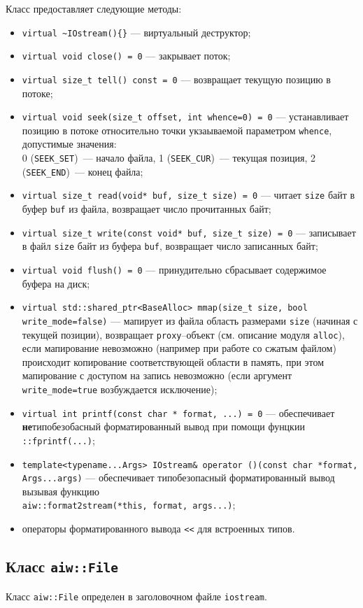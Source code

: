 Класс предоставляет следующие методы:
\begin{itemize}
\item \verb'virtual ~IOstream(){}' --- виртуальный деструктор;
\item \verb'virtual void close() = 0' --- закрывает поток;
\item \verb'virtual size_t tell() const = 0' --- возвращает текущую позицию в потоке;
\item \verb'virtual void seek(size_t offset, int whence=0) = 0' --- устанавливает позицию в потоке относительно
  точки укзаываемой параметром \verb'whence', допустимые значения:\\
  0 (\verb'SEEK_SET')~--- начало файла, 1 (\verb'SEEK_CUR')~--- текущая позиция, 2 (\verb'SEEK_END')~--- конец файла;
\item \verb'virtual size_t read(void* buf, size_t size) = 0' --- читает \verb'size' байт в буфер \verb'buf' из файла,
  возвращает число прочитанных байт;
\item \verb'virtual size_t write(const void* buf, size_t size) = 0' --- записывает в файл \verb'size' байт из буфера \verb'buf',
  возвращает число записанных байт;
\item \verb'virtual void flush() = 0' --- принудительно сбрасывает содержимое буфера на диск;
\item \verb'virtual std::shared_ptr<BaseAlloc> mmap(size_t size, bool write_mode=false)' --- мапирует из файла область
  размерами \verb'size' (начиная с текущей позиции), возвращает \verb'proxy'--объект (см. описание модуля \verb'alloc'),
  если мапирование невозможно (например при работе со сжатым файлом) происходит копирование
  соответствующей области в память, при этом мапирование с доступом на запись невозможно
  (если аргумент \verb'write_mode=true' возбуждается исключение);
\item \verb'virtual int printf(const char * format, ...) = 0' --- обеспечивает
  {\bf не}типобезобасный форматированный вывод при помощи фунцкии \verb'::fprintf(...)';
\item \verb'template<typename...Args> IOstream& operator ()(const char *format, Args...args)' --- обеспечивает
  типобезопасный форматированный вывод вызывая функцию\\  \verb'aiw::format2stream(*this, format, args...)';
\item операторы форматированного вывода \verb'<<' для встроенных типов.
\end{itemize}


\subsection{Класс {\tt aiw::File}}
Класс \verb'aiw::File' определен в заголовочном файле \verb'iostream'.

